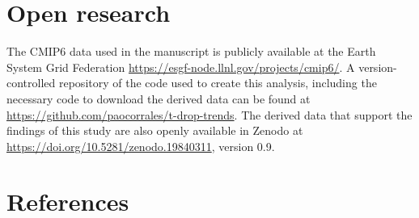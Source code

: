 \documentclass[
]{agujournal2019}
\begin{document}
\section{Open research}\label{open-research}

The CMIP6 data used in the manuscript is publicly available at the Earth
System Grid Federation \url{https://esgf-node.llnl.gov/projects/cmip6/}.
A version-controlled repository of the code used to create this
analysis, including the necessary code to download the derived data can
be found at \url{https://github.com/paocorrales/t-drop-trends}. The
derived data that support the findings of this study are also openly
available in Zenodo at \url{https://doi.org/10.5281/zenodo.19840311},
version 0.9.

\section*{References}\label{references}
\end{document}
